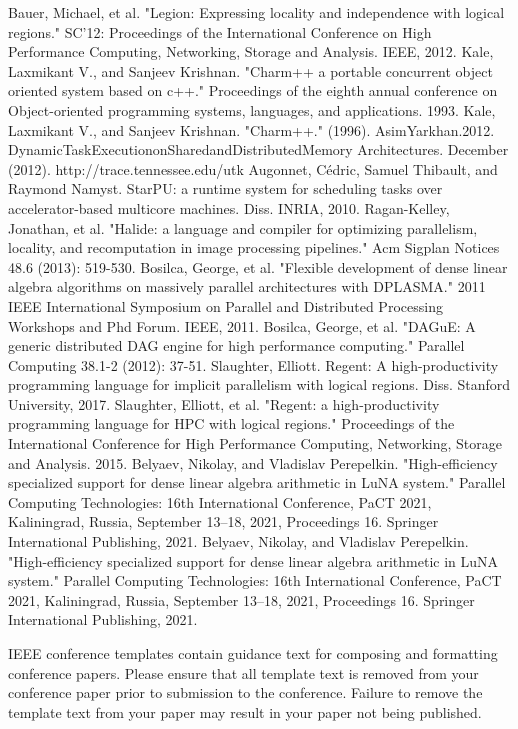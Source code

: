 \documentclass[conference]{IEEEtran}
\begin{document}
\begin{thebibliography}{00}
 Bauer, Michael, et al. "Legion: Expressing locality and independence with logical regions." SC'12: Proceedings of the International Conference on High Performance Computing, Networking, Storage and Analysis. IEEE, 2012.
 Kale, Laxmikant V., and Sanjeev Krishnan. "Charm++ a portable concurrent object oriented system based on c++." Proceedings of the eighth annual conference on Object-oriented programming systems, languages, and applications. 1993.
 Kale, Laxmikant V., and Sanjeev Krishnan. "Charm++." (1996).
 AsimYarkhan.2012. DynamicTaskExecutiononSharedandDistributedMemory Architectures. December (2012). http://trace.tennessee.edu/utk
 Augonnet, Cédric, Samuel Thibault, and Raymond Namyst. StarPU: a runtime system for scheduling tasks over accelerator-based multicore machines. Diss. INRIA, 2010.
 Ragan-Kelley, Jonathan, et al. "Halide: a language and compiler for optimizing parallelism, locality, and recomputation in image processing pipelines." Acm Sigplan Notices 48.6 (2013): 519-530.
 Bosilca, George, et al. "Flexible development of dense linear algebra algorithms on massively parallel architectures with DPLASMA." 2011 IEEE International Symposium on Parallel and Distributed Processing Workshops and Phd Forum. IEEE, 2011.
 Bosilca, George, et al. "DAGuE: A generic distributed DAG engine for high performance computing." Parallel Computing 38.1-2 (2012): 37-51.
 Slaughter, Elliott. Regent: A high-productivity programming language for implicit parallelism with logical regions. Diss. Stanford University, 2017.
 Slaughter, Elliott, et al. "Regent: a high-productivity programming language for HPC with logical regions." Proceedings of the International Conference for High Performance Computing, Networking, Storage and Analysis. 2015.
 Belyaev, Nikolay, and Vladislav Perepelkin. "High-efficiency specialized support for dense linear algebra arithmetic in LuNA system." Parallel Computing Technologies: 16th International Conference, PaCT 2021, Kaliningrad, Russia, September 13–18, 2021, Proceedings 16. Springer International Publishing, 2021.
 Belyaev, Nikolay, and Vladislav Perepelkin. "High-efficiency specialized support for dense linear algebra arithmetic in LuNA system." Parallel Computing Technologies: 16th International Conference, PaCT 2021, Kaliningrad, Russia, September 13–18, 2021, Proceedings 16. Springer International Publishing, 2021.
\end{thebibliography}

\vspace{12pt}
\color{red}
IEEE conference templates contain guidance text for composing and formatting conference papers. Please ensure that all template text is removed from your conference paper prior to submission to the conference. Failure to remove the template text from your paper may result in your paper not being published.
\end{document}
